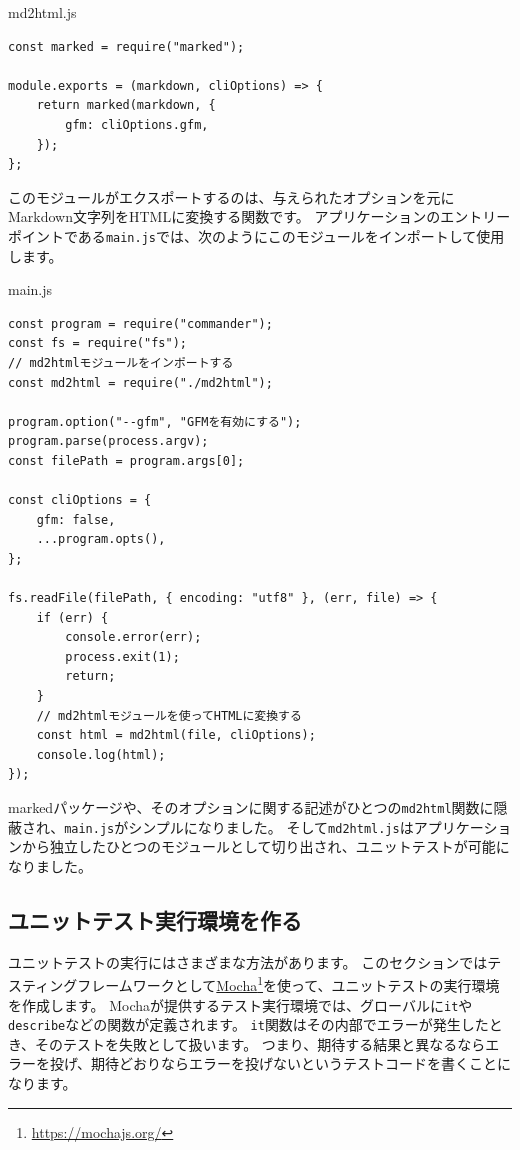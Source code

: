 \begin{listtitle}
md2html.js
\end{listtitle}
\begin{lstlisting}
const marked = require("marked");

module.exports = (markdown, cliOptions) => {
    return marked(markdown, {
        gfm: cliOptions.gfm,
    });
};
\end{lstlisting}
\listend

このモジュールがエクスポートするのは、与えられたオプションを元にMarkdown文字列をHTMLに変換する関数です。
アプリケーションのエントリーポイントである\texttt{main.js}では、次のようにこのモジュールをインポートして使用します。

\begin{listtitle}
main.js
\end{listtitle}
\begin{lstlisting}
const program = require("commander");
const fs = require("fs");
// md2htmlモジュールをインポートする
const md2html = require("./md2html");

program.option("--gfm", "GFMを有効にする");
program.parse(process.argv);
const filePath = program.args[0];

const cliOptions = {
    gfm: false,
    ...program.opts(),
};

fs.readFile(filePath, { encoding: "utf8" }, (err, file) => {
    if (err) {
        console.error(err);
        process.exit(1);
        return;
    }
    // md2htmlモジュールを使ってHTMLに変換する
    const html = md2html(file, cliOptions);
    console.log(html);
});
\end{lstlisting}
\listend

markedパッケージや、そのオプションに関する記述がひとつの\texttt{md2html}関数に隠蔽され、\texttt{main.js}がシンプルになりました。
そして\texttt{md2html.js}はアプリケーションから独立したひとつのモジュールとして切り出され、ユニットテストが可能になりました。

\hypertarget{create-env}{%
\subsection{ユニットテスト実行環境を作る}\label{create-env}}

ユニットテストの実行にはさまざまな方法があります。
このセクションではテスティングフレームワークとして\href{https://mochajs.org/}{Mocha}\footnote{\url{https://mochajs.org/}}を使って、ユニットテストの実行環境を作成します。
Mochaが提供するテスト実行環境では、グローバルに\texttt{it}や\texttt{describe}などの関数が定義されます。
\texttt{it}関数はその内部でエラーが発生したとき、そのテストを失敗として扱います。
つまり、期待する結果と異なるならエラーを投げ、期待どおりならエラーを投げないというテストコードを書くことになります。

